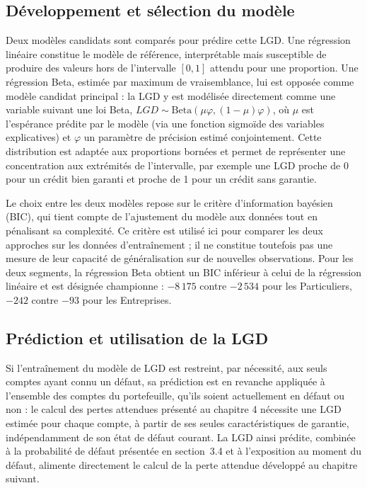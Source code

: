\subsection{Développement et sélection du modèle}

Deux modèles candidats sont comparés pour prédire cette LGD. Une régression linéaire constitue le modèle de référence, interprétable mais susceptible de produire des valeurs hors de l'intervalle $[0,1]$ attendu pour une proportion. Une régression Beta, estimée par maximum de vraisemblance, lui est opposée comme modèle candidat principal : la LGD y est modélisée directement comme une variable suivant une loi Beta, $LGD \sim \text{Beta}(\mu\varphi, (1-\mu)\varphi)$, où $\mu$ est l'espérance prédite par le modèle (via une fonction sigmoïde des variables explicatives) et $\varphi$ un paramètre de précision estimé conjointement. Cette distribution est adaptée aux proportions bornées et permet de représenter une concentration aux extrémités de l'intervalle, par exemple une LGD proche de 0 pour un crédit bien garanti et proche de 1 pour un crédit sans garantie.

Le choix entre les deux modèles repose sur le critère d'information bayésien (BIC), qui tient compte de l'ajustement du modèle aux données tout en pénalisant sa complexité. Ce critère est utilisé ici pour comparer les deux approches sur les données d'entraînement ; il ne constitue toutefois pas une mesure de leur capacité de généralisation sur de nouvelles observations. Pour les deux segments, la régression Beta obtient un BIC inférieur à celui de la régression linéaire et est désignée championne : $-8\,175$ contre $-2\,534$ pour les Particuliers, $-242$ contre $-93$ pour les Entreprises.

\subsection{Prédiction et utilisation de la LGD}

Si l'entraînement du modèle de LGD est restreint, par nécessité, aux seuls comptes ayant connu un défaut, sa prédiction est en revanche appliquée à l'ensemble des comptes du portefeuille, qu'ils soient actuellement en défaut ou non : le calcul des pertes attendues présenté au chapitre 4 nécessite une LGD estimée pour chaque compte, à partir de ses seules caractéristiques de garantie, indépendamment de son état de défaut courant. La LGD ainsi prédite, combinée à la probabilité de défaut présentée en section~3.4 et à l'exposition au moment du défaut, alimente directement le calcul de la perte attendue développé au chapitre suivant.

